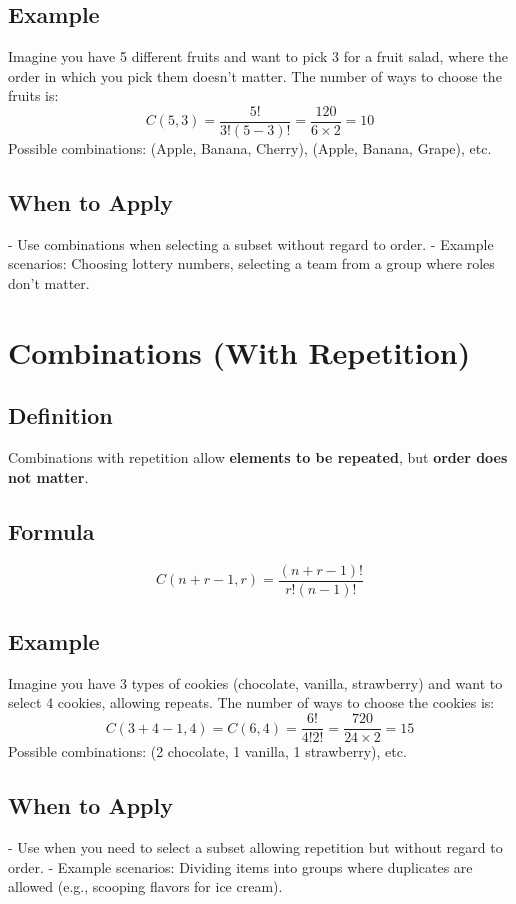 \documentclass{article}
\begin{document}
\subsection{Example}
Imagine you have 5 different fruits and want to pick 3 for a fruit salad, where the order in which you pick them doesn’t matter. The number of ways to choose the fruits is:
\[
C(5, 3) = \frac{5!}{3!(5 - 3)!} = \frac{120}{6 \times 2} = 10
\]
Possible combinations: (Apple, Banana, Cherry), (Apple, Banana, Grape), etc.

\subsection{When to Apply}
- Use combinations when selecting a subset without regard to order.
- Example scenarios: Choosing lottery numbers, selecting a team from a group where roles don’t matter.

\newpage
\section{Combinations (With Repetition)}

\subsection{Definition}
Combinations with repetition allow \textbf{elements to be repeated}, but \textbf{order does not matter}.

\subsection{Formula}
\[
C(n + r - 1, r) = \frac{(n + r - 1)!}{r!(n - 1)!}
\]

\subsection{Example}
Imagine you have 3 types of cookies (chocolate, vanilla, strawberry) and want to select 4 cookies, allowing repeats. The number of ways to choose the cookies is:
\[
C(3 + 4 - 1, 4) = C(6, 4) = \frac{6!}{4!2!} = \frac{720}{24 \times 2} = 15
\]
Possible combinations: (2 chocolate, 1 vanilla, 1 strawberry), etc.

\subsection{When to Apply}
- Use when you need to select a subset allowing repetition but without regard to order.
- Example scenarios: Dividing items into groups where duplicates are allowed (e.g., scooping flavors for ice cream).
\end{document}
